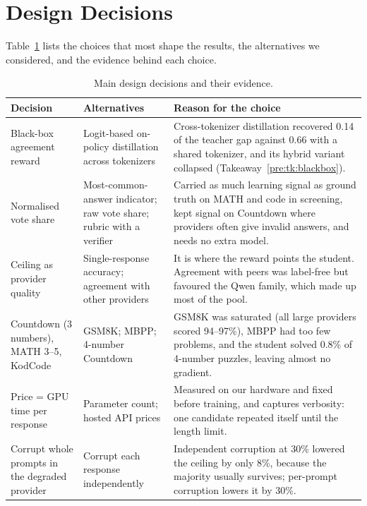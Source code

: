 \section{Design Decisions}
\label{pre:sec:decisions}

Table~\ref{pre:tab:decisions} lists the choices that most shape the results, the
alternatives we considered, and the evidence behind each choice.

\begin{table}[htbp]
\centering
\footnotesize
\renewcommand{\arraystretch}{1.1}
\begin{tabular}{@{}>{\raggedright\arraybackslash}p{2.7cm}
                >{\raggedright\arraybackslash}p{3.9cm}
                >{\raggedright\arraybackslash}p{8.3cm}@{}}
\toprule
\textbf{Decision} & \textbf{Alternatives} & \textbf{Reason for the choice} \\
\midrule
Black-box agreement reward & Logit-based on-policy distillation across tokenizers &
  Cross-tokenizer distillation recovered 0.14 of the teacher gap against 0.66 with a shared
  tokenizer, and its hybrid variant collapsed (Takeaway~\ref{pre:tk:blackbox}). \\
Normalised vote share & Most-common-answer indicator; raw vote share; rubric with a verifier &
  Carried as much learning signal as ground truth on MATH and code in screening, kept signal
  on Countdown where providers often give invalid answers, and needs no extra model. \\
Ceiling as provider quality & Single-response accuracy; agreement with other providers &
  It is where the reward points the student. Agreement with peers was label-free but
  favoured the Qwen family, which made up most of the pool. \\
Countdown (3 numbers), MATH 3--5, KodCode & GSM8K; MBPP; 4-number Countdown &
  GSM8K was saturated (all large providers scored 94--97\%), MBPP had too few problems, and
  the student solved 0.8\% of 4-number puzzles, leaving almost no gradient. \\
Price = GPU time per response & Parameter count; hosted API prices &
  Measured on our hardware and fixed before training, and captures verbosity: one candidate
  repeated itself until the length limit. \\
Corrupt whole prompts in the degraded provider & Corrupt each response independently &
  Independent corruption at 30\% lowered the ceiling by only 8\%, because the majority
  usually survives; per-prompt corruption lowers it by 30\%. \\
\bottomrule
\end{tabular}
\caption{Main design decisions and their evidence.}
\label{pre:tab:decisions}
\end{table}

